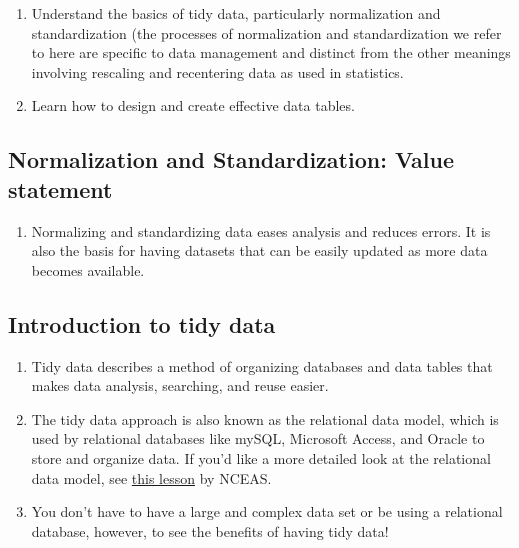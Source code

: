 \documentclass[
]{book}
\providecommand{\tightlist}{%
  \setlength{\itemsep}{0pt}\setlength{\parskip}{0pt}}
\begin{document}
\begin{enumerate}
\def\labelenumi{\arabic{enumi}.}
\item
  Understand the basics of tidy data, particularly normalization and standardization (the processes of normalization and standardization we refer to here are specific to data management and distinct from the other meanings involving rescaling and recentering data as used in statistics.
\item
  Learn how to design and create effective data tables.
\end{enumerate}

\hypertarget{normalization-and-standardization-value-statement}{%
\subsection{Normalization and Standardization: Value statement}\label{normalization-and-standardization-value-statement}}

\begin{enumerate}
\def\labelenumi{\arabic{enumi}.}
\tightlist
\item
  Normalizing and standardizing data eases analysis and reduces errors. It is also the basis for having datasets that can be easily updated as more data becomes available.
\end{enumerate}

\hypertarget{introduction-to-tidy-data}{%
\subsection{Introduction to tidy data}\label{introduction-to-tidy-data}}

\begin{enumerate}
\def\labelenumi{\arabic{enumi}.}
\item
  Tidy data describes a method of organizing databases and data tables that makes data analysis, searching, and reuse easier.
\item
  The tidy data approach is also known as the relational data model, which is used by relational databases like mySQL, Microsoft Access, and Oracle to store and organize data. If you'd like a more detailed look at the relational data model, see \href{https://learning.nceas.ucsb.edu/2020-11-RRCourse/session-7-data-modeling-essentials.html\#data-modeling-tidy-data}{this lesson} by NCEAS.
\item
  You don't have to have a large and complex data set or be using a relational database, however, to see the benefits of having tidy data!
\end{enumerate}
\end{document}

